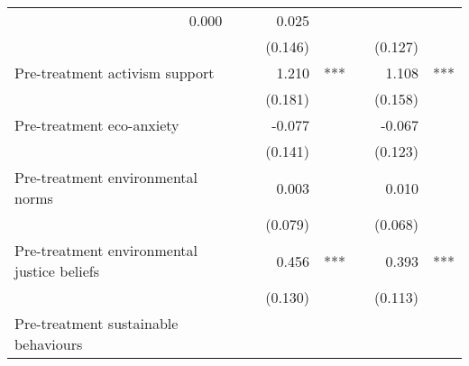 \documentclass{article}
\begin{document}
\begin{table}[!h]
\begin{tabular}{llllllll}
  \multicolumn{1}{r}{0.000} &
  \multicolumn{1}{l}{} &
  \multicolumn{1}{r}{} &
  \multicolumn{1}{r}{0.025} &
  \multicolumn{1}{l}{} \\
\multicolumn{1}{l}{} &
  \multicolumn{1}{r}{} &
  \multicolumn{1}{l}{} &
  \multicolumn{1}{r}{(0.146)} &
  \multicolumn{1}{l}{} &
  \multicolumn{1}{r}{} &
  \multicolumn{1}{r}{(0.127)} &
  \multicolumn{1}{l}{} \\
\multicolumn{1}{l}{Pre-treatment activism support} &
  \multicolumn{1}{r}{} &
  \multicolumn{1}{l}{} &
  \multicolumn{1}{r}{1.210} &
  \multicolumn{1}{l}{***} &
  \multicolumn{1}{r}{} &
  \multicolumn{1}{r}{1.108} &
  \multicolumn{1}{l}{***} \\
\multicolumn{1}{l}{} &
  \multicolumn{1}{r}{} &
  \multicolumn{1}{l}{} &
  \multicolumn{1}{r}{(0.181)} &
  \multicolumn{1}{l}{} &
  \multicolumn{1}{r}{} &
  \multicolumn{1}{r}{(0.158)} &
  \multicolumn{1}{l}{} \\
\multicolumn{1}{l}{Pre-treatment eco-anxiety} &
  \multicolumn{1}{r}{} &
  \multicolumn{1}{l}{} &
  \multicolumn{1}{r}{-0.077} &
  \multicolumn{1}{l}{} &
  \multicolumn{1}{r}{} &
  \multicolumn{1}{r}{-0.067} &
  \multicolumn{1}{l}{} \\
\multicolumn{1}{l}{} &
  \multicolumn{1}{r}{} &
  \multicolumn{1}{l}{} &
  \multicolumn{1}{r}{(0.141)} &
  \multicolumn{1}{l}{} &
  \multicolumn{1}{r}{} &
  \multicolumn{1}{r}{(0.123)} &
  \multicolumn{1}{l}{} \\
\multicolumn{1}{l}{Pre-treatment environmental norms} &
  \multicolumn{1}{r}{} &
  \multicolumn{1}{l}{} &
  \multicolumn{1}{r}{0.003} &
  \multicolumn{1}{l}{} &
  \multicolumn{1}{r}{} &
  \multicolumn{1}{r}{0.010} &
  \multicolumn{1}{l}{} \\
\multicolumn{1}{l}{} &
  \multicolumn{1}{r}{} &
  \multicolumn{1}{l}{} &
  \multicolumn{1}{r}{(0.079)} &
  \multicolumn{1}{l}{} &
  \multicolumn{1}{r}{} &
  \multicolumn{1}{r}{(0.068)} &
  \multicolumn{1}{l}{} \\
\multicolumn{1}{l}{Pre-treatment environmental justice beliefs} &
  \multicolumn{1}{r}{} &
  \multicolumn{1}{l}{} &
  \multicolumn{1}{r}{0.456} &
  \multicolumn{1}{l}{***} &
  \multicolumn{1}{r}{} &
  \multicolumn{1}{r}{0.393} &
  \multicolumn{1}{l}{***} \\
\multicolumn{1}{l}{} &
  \multicolumn{1}{r}{} &
  \multicolumn{1}{l}{} &
  \multicolumn{1}{r}{(0.130)} &
  \multicolumn{1}{l}{} &
  \multicolumn{1}{r}{} &
  \multicolumn{1}{r}{(0.113)} &
  \multicolumn{1}{l}{} \\
\multicolumn{1}{l}{Pre-treatment sustainable behaviours} &

\end{tabular}
\end{table}
\end{document}
